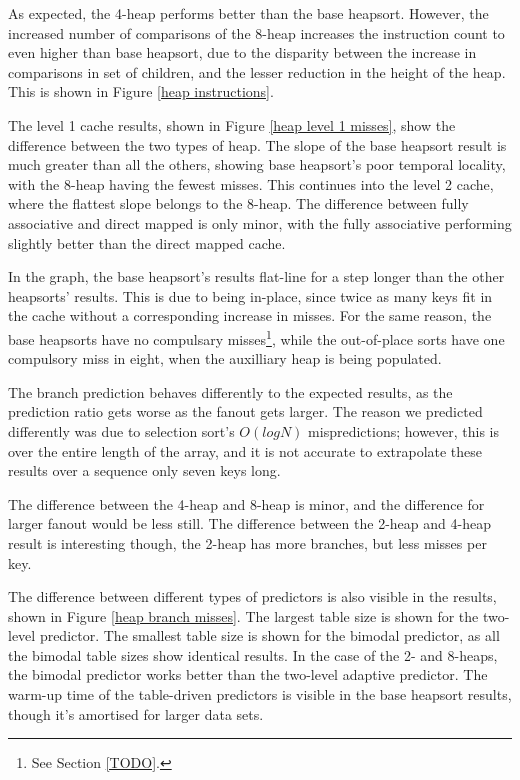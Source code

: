 
As expected, the 4-heap performs better than the base heapsort. However, the
increased number of comparisons of the 8-heap increases the instruction count to
even higher than base heapsort, due to the disparity between the increase in
comparisons in set of children, and the lesser reduction in the height of the
heap. This is shown in Figure \ref{heap instructions}.

The level 1 cache results, shown in Figure \ref{heap level 1 misses}, show the
difference between the two types of heap. The slope of the base heapsort result
is much greater than all the others, showing base heapsort's poor temporal
locality, with the 8-heap having the fewest misses. This continues into the
level 2 cache, where the flattest slope belongs to the 8-heap. The difference
between fully associative and direct mapped is only minor, with the fully
associative performing slightly better than the direct mapped cache.

In the graph, the base heapsort's results flat-line for a step longer than the
other heapsorts' results. This is due to being in-place, since twice as many
keys fit in the cache without a corresponding increase in misses. For the same
reason, the base heapsorts have no compulsary misses\footnote{See Section
\ref{TODO}.}, while the out-of-place sorts have one compulsory miss in eight,
when the auxilliary heap is being populated.

The branch prediction behaves differently to the expected results, as the
prediction ratio gets worse as the fanout gets larger. The reason we predicted
differently was due to selection sort's $O(log N)$ mispredictions; however, this
is over the entire length of the array, and it is not accurate to extrapolate
these results over a sequence only seven keys long.

The difference between the 4-heap and 8-heap is minor, and the difference for
larger fanout would be less still. The difference between the 2-heap and 4-heap
result is interesting though, the 2-heap has more branches, but less misses per
key.

The difference between different types of predictors is also visible in the
results, shown in Figure \ref{heap branch misses}. The largest table size is
shown for the two-level predictor. The smallest table size is shown for the
bimodal predictor, as all the bimodal table sizes show identical results.  In
the case of the 2- and 8-heaps, the bimodal predictor works better than the
two-level adaptive predictor. The warm-up time of the table-driven predictors is
visible in the base heapsort results, though it's amortised for larger data
sets.

